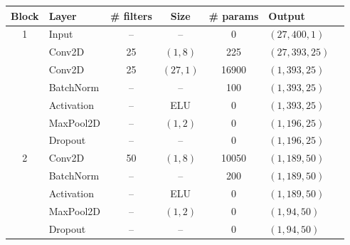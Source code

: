 \begin{table}[htbp]
    \centering
    \footnotesize
    \begin{tabular}{clcccll}
        \toprule
        \textbf{Block} & \textbf{Layer} & \textbf{\# filters} & \textbf{Size} & \textbf{\# params} & \textbf{Output}   \\
        \midrule
        1              & Input          & --                  & --            & 0                  & \((27, 400, 1)\)  \\

                       & Conv2D         & 25                  & \((1,8)\)     & 225                & \((27, 393, 25)\) \\

                       & Conv2D         & 25                  & \((27,1)\)    & 16900              & \((1, 393, 25)\)  \\

                       & BatchNorm      & --                  & --            & 100                & \((1, 393, 25)\)  \\

                       & Activation     & --                  & ELU           & 0                  & \((1, 393, 25)\)  \\

                       & MaxPool2D      & --                  & \((1,2)\)     & 0                  & \((1, 196, 25)\)  \\

                       & Dropout        & --                  & --            & 0                  & \((1, 196, 25)\)  \\
        \midrule

        2              & Conv2D         & 50                  & \((1,8)\)     & 10050              & \((1, 189, 50)\)  \\

                       & BatchNorm      & --                  & --            & 200                & \((1, 189, 50)\)  \\
                       & Activation     & --                  & ELU           & 0                  & \((1, 189, 50)\)  \\

                       & MaxPool2D      & --                  & \((1,2)\)     & 0                  & \((1, 94, 50)\)   \\

                       & Dropout        & --                  & --            & 0                  & \((1, 94, 50)\)   \\
        \midrule


\end{tabular}
\end{table}
